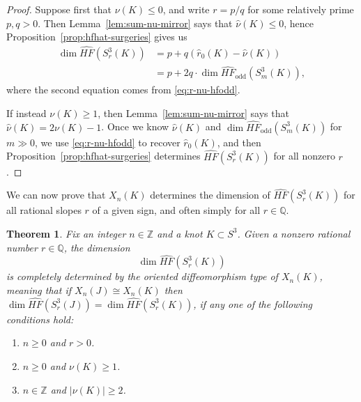 \documentclass[11pt]{amsart}
\newtheorem {theorem}{Theorem}
\numberwithin{equation}{section}
\numberwithin{theorem}{section}
\theoremstyle{definition}
\newcommand{\Z}{\mathbb{Z}}
\newcommand{\Q}{\mathbb{Q}}
\newcommand{\hfhat}{\widehat{\mathit{HF}}}
\newcommand{\godd}{\mathrm{odd}}
\begin{document}
\begin{proof}
Suppose first that $\nu(K) \leq 0$, and write $r=p/q$ for some relatively prime $p,q > 0$.  Then Lemma~\ref{lem:sum-nu-mirror} says that $\hat\nu(K) \leq 0$, hence Proposition~\ref{prop:hfhat-surgeries} gives us
\begin{align*}
\dim \hfhat(S^3_r(K)) &= p + q(\hat{r}_0(K) - \hat{\nu}(K)) \\
&= p + 2q\cdot \dim \hfhat_\godd(S^3_m(K)),
\end{align*}
where the second equation comes from \eqref{eq:r-nu-hfodd}.

If instead $\nu(K) \geq 1$, then Lemma~\ref{lem:sum-nu-mirror} says that $\hat{\nu}(K) = 2\nu(K)-1$.  Once we know $\hat\nu(K)$ and $\dim \hfhat_\godd(S^3_m(K))$ for $m \gg 0$, we use \eqref{eq:r-nu-hfodd} to recover $\hat{r}_0(K)$, and then Proposition~\ref{prop:hfhat-surgeries} determines $\hfhat(S^3_r(K))$ for all nonzero $r$.
\end{proof}

We can now prove that $X_n(K)$ determines the dimension of $\hfhat(S^3_r(K))$ for all rational slopes $r$ of a given sign, and often simply for all $r\in\Q$.

\begin{theorem} \label{thm:trace-determines-hfhat-restated}
Fix an integer $n \in \Z$ and a knot $K \subset S^3$.  Given a nonzero rational number $r\in\Q$, the dimension
\[ \dim \hfhat(S^3_r(K)) \]
is completely determined by the oriented diffeomorphism type of $X_n(K)$, meaning that if $X_n(J) \cong X_n(K)$ then $\dim \hfhat(S^3_r(J)) = \dim \hfhat(S^3_r(K))$, if any one of the following conditions hold:
\begin{enumerate}
\item $n \geq 0$ and $r > 0$. \label{i:n-r-positive}
\item $n \geq 0$ and $\nu(K) \geq 1$. \label{i:n-nu-positive}
\item $n \in \Z$ and $|\nu(K)| \geq 2$. \label{i:n-nu-large}
\end{enumerate}
\end{theorem}
\end{document}
